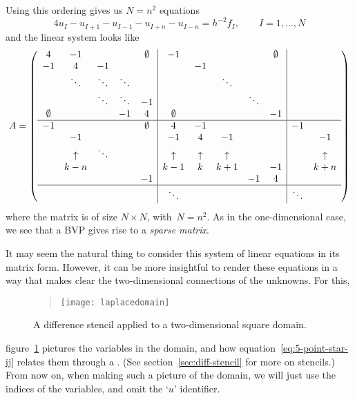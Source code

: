 Using this ordering gives us $N=n^2$ equations
\begin{equation}
  4u_I-u_{I+1}-u_{I-1}-u_{I+n}-u_{I-n}=h^{-2}f_I,\qquad I=1,\ldots,N
  \label{eq:5-point-star-linear}
\end{equation}
and the linear system looks like
\begin{equation}
  \label{eq:5starmatrix}
  A=
  \left(\begin{array}{ccccc|ccccc|cc}
    4&-1&&&\emptyset&-1&&&&\emptyset&\\ 
    -1&4&-1&&&&-1&&&&\\ 
    &\ddots&\ddots&\ddots&&&&\ddots&&\\ 
    &&\ddots&\ddots&-1&&&&\ddots&\\ 
    \emptyset&&&-1&4&\emptyset&&&&-1&\\ \hline
    -1&&&&\emptyset&4&-1&&&&-1\\
    &-1      &      &&&-1      &4       &-1      &&&&-1\\
    &\uparrow&\ddots&&&\uparrow&\uparrow&\uparrow&&  &&\uparrow\\
    &k-n     &      &&&k-1     &k       &k+1     &&-1&&k+n\\
    &&&&-1&&&&-1&4&&\\ \hline
    &        &      &&&\ddots  &        &        &&  &\ddots\\
  \end{array}\right)
\end{equation}
where the matrix is of size $N\times N$, with~$N=n^2$.
As in the one-dimensional case, we see that a \ac{BVP}
gives rise to a \emph{sparse matrix}.

It may seem the natural thing to consider
this system of linear equations in its matrix form.
However, it can be more insightful to render these equations in a way
that makes clear the two-dimensional connections of the unknowns. For this,
\begin{figure}
  \begin{quote}
    \texttt{[image: laplacedomain]}
  \end{quote}
  \caption{A difference stencil applied to a two-dimensional square
    domain.}
  \label{fig:laplacedomain}
\end{figure}
figure~\ref{fig:laplacedomain} pictures the variables in the domain,
and how 
equation~\eqref{eq:5-point-star-ij} relates them through a
%
.
(See section~\ref{sec:diff-stencil} for more on stencils.)
From now on, when
making such a picture of the domain, we will
just use the indices of the variables, and omit the `$u$' identifier.


